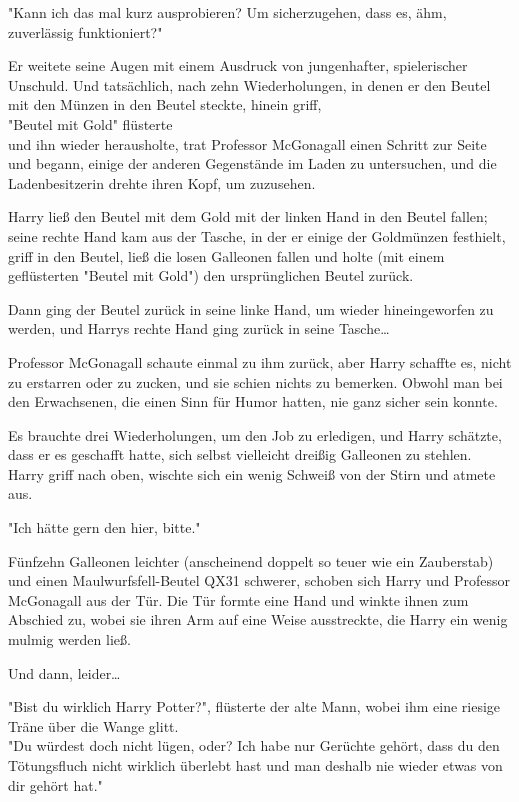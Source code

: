 {"Kann ich das mal kurz ausprobieren? Um sicherzugehen, dass es, ähm, zuverlässig funktioniert?"

Er weitete seine Augen mit einem Ausdruck von jungenhafter, spielerischer Unschuld. Und tatsächlich, nach zehn Wiederholungen, in denen er den Beutel mit den Münzen in den Beutel steckte, hinein griff,\\ "Beutel mit Gold" flüsterte\\ und ihn wieder herausholte, trat Professor McGonagall einen Schritt zur Seite und begann, einige der anderen Gegenstände im Laden zu untersuchen, und die Ladenbesitzerin drehte ihren Kopf, um zuzusehen.

Harry ließ den Beutel mit dem Gold mit der linken Hand in den Beutel fallen; seine rechte Hand kam aus der Tasche, in der er einige der Goldmünzen festhielt, griff in den Beutel, ließ die losen Galleonen fallen und holte (mit einem geflüsterten "Beutel mit Gold") den ursprünglichen Beutel zurück.

Dann ging der Beutel zurück in seine linke Hand, um wieder hineingeworfen zu werden, und Harrys rechte Hand ging zurück in seine Tasche…

Professor McGonagall schaute einmal zu ihm zurück, aber Harry schaffte es, nicht zu erstarren oder zu zucken, und sie schien nichts zu bemerken. Obwohl man bei den Erwachsenen, die einen Sinn für Humor hatten, nie ganz sicher sein konnte.

Es brauchte drei Wiederholungen, um den Job zu erledigen, und Harry schätzte, dass er es geschafft hatte, sich selbst vielleicht dreißig Galleonen zu stehlen. Harry griff nach oben, wischte sich ein wenig Schweiß von der Stirn und atmete aus.

"Ich hätte gern den hier, bitte."

Fünfzehn Galleonen leichter (anscheinend doppelt so teuer wie ein Zauberstab) und einen Maulwurfsfell-Beutel QX31 schwerer, schoben sich Harry und Professor McGonagall aus der Tür. Die Tür formte eine Hand und winkte ihnen zum Abschied zu, wobei sie ihren Arm auf eine Weise ausstreckte, die Harry ein wenig mulmig werden ließ.

Und dann, leider…

"Bist du wirklich Harry Potter?", flüsterte der alte Mann, wobei ihm eine riesige Träne über die Wange glitt.\\ "Du würdest doch nicht lügen, oder? Ich habe nur Gerüchte gehört, dass du den Tötungsfluch nicht wirklich überlebt hast und man deshalb nie wieder etwas von dir gehört hat."

}
